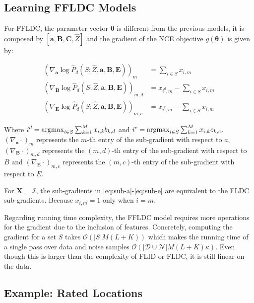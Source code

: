 \subsection{Learning FFLDC Models}

For FFLDC, the parameter vector $\boldsymbol{\theta}$ is different from the previous models, it is composed by $[\mathbf{a}, \mathbf{B}, \mathbf{C}, \hat{Z}]$ and the gradient of the NCE objective $g(\boldsymbol{\theta})$ is given by:

\begin{align}
  \left(\nabla_{\mathbf{a}}\log{\hat{P}_{d}(S; \hat{Z}, \mathbf{a}, \mathbf{B}, \mathbf{E})}\right)_{m} &= \sum_{i \in S} x_{i,m} \label{eq:sub-a}\\
  \left(\nabla_{\mathbf{B}}\log{\hat{P}_{d}(S; \hat{Z}, \mathbf{a}, \mathbf{B}, \mathbf{E})}\right)_{m,d} &= x_{i^{d},m} - \sum_{i \in S} x_{i,m} \label{eq:sub-b} \\
  \left(\nabla_{\mathbf{E}}\log{\hat{P}_{d}(S; \hat{Z}, \mathbf{a}, \mathbf{B}, \mathbf{E})}\right)_{m,c} &= x_{i^{c},m} - \sum_{i \in S} x_{i,m} \label{eq:sub-e}
\end{align}

Where $i^{d} = \operatorname*{argmax}_{i \in S}{\sum_{k=1}^{M}{x_{i,k}b_{k,d}}}$ and $i^{c} = \operatorname*{argmax}_{i \in S}{\sum_{k=1}^{M}x_{i,k}e_{k,c}}$. $\left(\nabla_{\mathbf{a}}\cdot \right)_{m}$ represents the $m$-th entry of the sub-gradient with respect to $a$, $\left(\nabla_{\mathbf{B}}\cdot\right)_{m,d}$ represents the $(m,d)$-th entry of the sub-gradient with respect to $B$ and $\left(\nabla_{\mathbf{E}}\cdot\right)_{m,c}$ represents the $(m,c)$-th entry of the sub-gradient with respect to $E$.

\begin{remark}
  For $\mathbf{X} = \mathcal{I}$, the sub-gradients in \ref{eq:sub-a}-\ref{eq:sub-e} are equivalent to the FLDC sub-gradients. Because $x_{i,m} = 1$ only when $i = m$.
\end{remark}

Regarding running time complexity, the FFLDC model requires more operations for the gradient due to the inclusion of features. Concretely, computing the gradient for a set $S$ takes $\mathcal{O}(|S|M(L+K))$ which makes the running time of a single pass over data and noise samples $\mathcal{O}(|\mathcal{D}\cup\mathcal{N}|M(L+K)\kappa)$. Even though this is larger than the complexity of FLID or FLDC, it is still linear on the data.

\subsection{Example: Rated Locations}
\label{sec:ffldc-toy}

